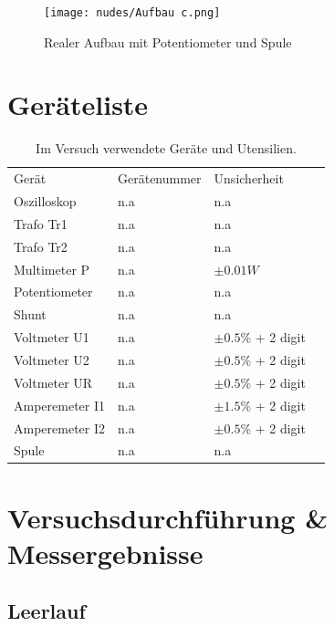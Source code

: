 \documentclass[12pt,a4paper,twoside]{article}
\begin{document}
\begin{figure}[H]
    \centering
    \texttt{[image: nudes/Aufbau c.png]}
    \caption{Realer Aufbau mit Potentiometer und Spule}
    \label{fig:RealerAufbauC}
\end{figure}



\section{Geräteliste} %

    \begin{table}[H]
        \centering
        \caption{Im Versuch verwendete Geräte und Utensilien.}
        \label{tab:geraete}
        \begin{tabular}{| l | l | l | l |}
            \hline
            Gerät & Gerätenummer  & Unsicherheit \\
            Oszilloskop & {n.a} & {n.a} \\
            Trafo Tr1 & {n.a} & {n.a} \\
            Trafo Tr2 & {n.a} & {n.a} \\
            Multimeter P & {n.a} & $\pm 0.01 W$ \cite{leybold}\\
            Potentiometer & {n.a} & {n.a} \\
            Shunt & {n.a} & {n.a} \\
            Voltmeter U1 & {n.a} & $\pm 0.5\%$ + 2 digit \\
            Voltmeter U2 & {n.a} & $\pm 0.5\%$ + 2 digit \\
            Voltmeter UR & {n.a} & $\pm 0.5\%$ + 2 digit \\
            Amperemeter I1 & {n.a} & $\pm 1.5\%$ + 2 digit \\
            Amperemeter I2 & {n.a} & $\pm 0.5\%$ + 2 digit \\
            Spule & {n.a} & {n.a} \\
            \hline
        \end{tabular}
    \end{table}


\section{Versuchsdurchführung \& Messergebnisse} %

\subsection{Leerlauf}
\end{document}
